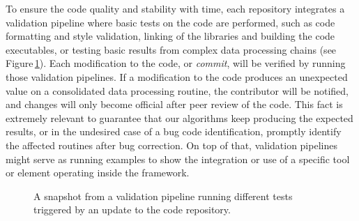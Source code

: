 

To ensure the code quality and stability with time, each repository integrates a validation pipeline where basic tests on the code are performed, such as code formatting and style validation, linking of the libraries and building the code executables, or testing basic results from complex data processing chains (see Figure\,\ref{fig:pipelines}). Each modification to the code, or \emph{commit}, will be verified by running those validation pipelines. If a modification to the code produces an unexpected value on a consolidated data processing routine, the contributor will be notified, and changes will only become official after peer review of the code. This fact is extremely relevant to guarantee that our algorithms keep producing the expected results, or in the undesired case of a bug code identification, promptly identify the affected routines after bug correction. On top of that, validation pipelines might serve as running examples to show the integration or use of a specific tool or element operating inside the framework.



\begin{figure}[htb!]
  \centering
	\caption{A snapshot from a validation pipeline running different tests triggered by an update to the code repository.}\label{fig:pipelines}
\end{figure}
